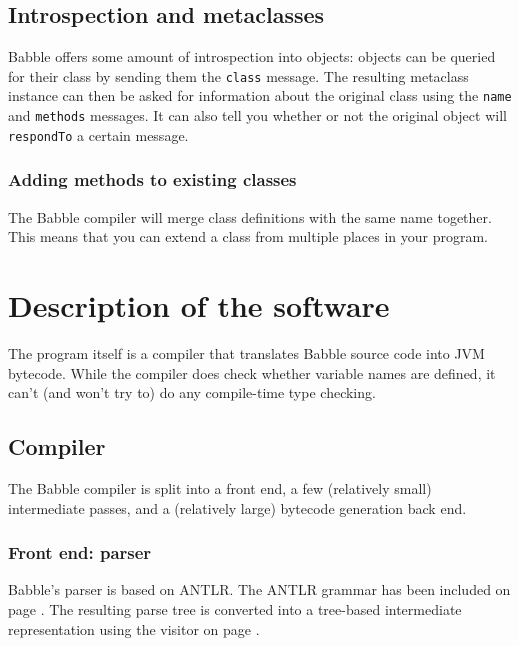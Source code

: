 \documentclass[a4paper]{article}
\begin{document}
\subsection{Introspection and metaclasses}

Babble offers some amount of introspection into objects: objects can be queried for their class by sending them the \texttt{class} message.
The resulting metaclass instance can then be asked for information about the original class using the \texttt{name} and \texttt{methods} messages.
It can also tell you whether or not the original object will \texttt{respondTo} a certain message.

\label{merge}
\subsubsection{Adding methods to existing classes}

The Babble compiler will merge class definitions with the same name together.
This means that you can extend a class from multiple places in your program.

\section{Description of the software}

The program itself is a compiler that translates Babble source code into JVM bytecode.
While the compiler does check whether variable names are defined, it can't (and won't try to) do any compile-time type checking.

\subsection{Compiler}

The Babble compiler is split into a front end, a few (relatively small) intermediate passes, and a (relatively large) bytecode generation back end.

\subsubsection{Front end: parser}

Babble's parser is based on ANTLR.
The ANTLR grammar has been included on page \pageref{grammar}.
The resulting parse tree is converted into a tree-based intermediate representation using the visitor on page \pageref{visitor}.
\end{document}
